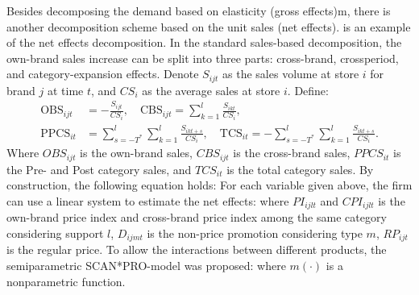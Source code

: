 \documentclass[10pt]{report}
\begin{document}
Besides decomposing the demand based on elasticity (gross effects)m, there is another decomposition scheme based on the unit sales (net effects). 
\cite{VanHeerde2004} is an example of the net effects decomposition. In the standard sales-based decomposition, the own-brand sales increase can be split into three parts: 
cross-brand, crossperiod, and category-expansion effects. Denote $S_{ijt}$ as the sales volume at store $i$ for brand $j$ at time $t$, and $CS_{i}$ as the average sales at store $i$. 
Define:
\[
    \begin{aligned}
        \mathrm{OBS}_{ijt}&=-\frac{S_{ijt}}{CS_i},\quad\mathrm{CBS}_{ijt}=\sum_{k=1}^{l}\frac{S_{ikt}}{CS_i},\\
        \mathrm{PPCS}_{it}&=\sum_{s=-T^*}^{l}\sum_{k=1}^{l}\frac{S_{ikt+s}}{CS_i},\quad\mathrm{TCS}_{it}=-\sum_{s=-T^*}^{l}\sum_{k=1}^{l}\frac{S_{ikt+s}}{CS_i}.
    \end{aligned}
\]
Where $OBS_{ijt}$ is the own-brand sales, $CBS_{ijt}$ is the cross-brand sales, $PPCS_{it}$ is the Pre- and Post category sales, and $TCS_{it}$ is the total category sales. By construction, the following equation holds:
For each variable given above, the firm can use a linear system to estimate the net effects:
where $PI_{ijlt}$ and $CPI_{ijlt}$ is the own-brand price index and cross-brand price index among the same category considering support $l$, $D_{ijmt}$ is the non-price promotion 
considering type $m$, $RP_{ijt}$ is the regular price. To allow the interactions between different products, the semiparametric SCAN*PRO-model was proposed:
where $m(\cdot)$ is a nonparametric function.
\end{document}
